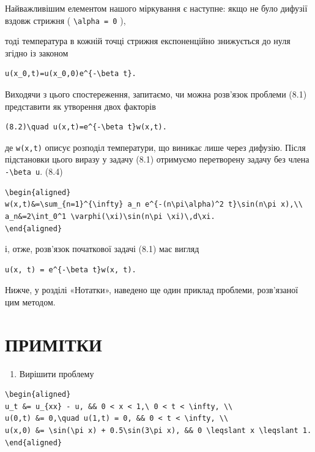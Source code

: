 \documentclass[
  ukrainian,
]{article}
\providecommand{\tightlist}{%
  \setlength{\itemsep}{0pt}\setlength{\parskip}{0pt}}
\begin{document}
Найважливішим елементом нашого міркування є наступне: якщо не було
дифузії вздовж стрижня ( \texttt{\textbackslash{}alpha\ =\ 0} ),

тоді температура в кожній точці стрижня експоненційно знижується до нуля
згідно із законом

\begin{verbatim}
u(x_0,t)=u(x_0,0)e^{-\beta t}.
\end{verbatim}

Виходячи з цього спостереження, запитаємо, чи можна розв'язок проблеми
(8.1) представити як утворення двох факторів

\begin{verbatim}
(8.2)\quad u(x,t)=e^{-\beta t}w(x,t).
\end{verbatim}

де \texttt{w(x,t)} описує розподіл температури, що виникає лише через
дифузію. Після підстановки цього виразу у задачу (8.1) отримуємо
перетворену задачу без члена \texttt{-\textbackslash{}beta\ u}. (8.4)

\begin{verbatim}
\begin{aligned}
w(x,t)&=\sum_{n=1}^{\infty} a_n e^{-(n\pi\alpha)^2 t}\sin(n\pi x),\\
a_n&=2\int_0^1 \varphi(\xi)\sin(n\pi \xi)\,d\xi.
\end{aligned}
\end{verbatim}

і, отже, розв'язок початкової задачі (8.1) має вигляд

\begin{verbatim}
u(x, t) = e^{-\beta t}w(x, t).
\end{verbatim}

Нижче, у розділі «Нотатки», наведено ще один приклад проблеми,
розв'язаної цим методом.

\section{ПРИМІТКИ}\label{ux43fux440ux438ux43cux456ux442ux43aux438}

\begin{enumerate}
\def\labelenumi{\arabic{enumi}.}
\tightlist
\item
  Вирішити проблему
\end{enumerate}

\begin{verbatim}
\begin{aligned}
u_t &= u_{xx} - u, && 0 < x < 1,\ 0 < t < \infty, \\
u(0,t) &= 0,\quad u(1,t) = 0, && 0 < t < \infty, \\
u(x,0) &= \sin(\pi x) + 0.5\sin(3\pi x), && 0 \leqslant x \leqslant 1.
\end{aligned}
\end{verbatim}
\end{document}
